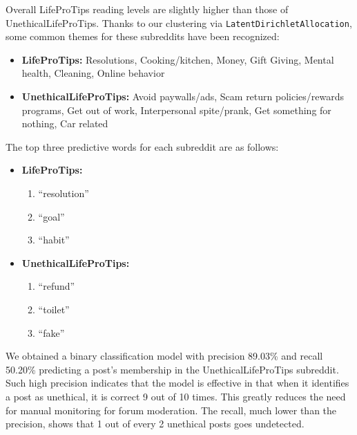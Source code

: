 \documentclass{amsart}
\theoremstyle{definition}
\theoremstyle{remark}
\newcommand{\tql}{\textquotedblleft}
\newcommand{\tqr}{\textquotedblright}
\begin{document}
Overall LifeProTips reading levels are slightly higher than those of UnethicalLifeProTips. Thanks to our clustering via \texttt{LatentDirichletAllocation}, some common themes for these subreddits have been recognized:
\begin{itemize}

	\item \textbf{LifeProTips:} Resolutions, Cooking/kitchen, Money, Gift Giving, Mental health, Cleaning, Online behavior
	
	\item \textbf{UnethicalLifeProTips:} Avoid paywalls/ads, Scam return policies/rewards programs, Get out of work, Interpersonal spite/prank, Get something for nothing, Car related

\end{itemize}
The top three predictive words for each subreddit are as follows:
\begin{itemize}
	
	\item \textbf{LifeProTips:}
	
		\begin{enumerate}
		
			\item \tql resolution\tqr
			
			\item \tql goal\tqr
			
			\item \tql habit\tqr
		
		\end{enumerate}
	
	\item \textbf{UnethicalLifeProTips:}
	
		\begin{enumerate}
		
			\item \tql refund\tqr
			
			\item \tql toilet\tqr
			
			\item \tql fake\tqr
		
		\end{enumerate}
	
\end{itemize}

We obtained a binary classification model with precision 89.03\% and recall 50.20\% predicting a post's membership in the UnethicalLifeProTips subreddit.  Such high precision indicates that the model is effective in that when it identifies a post as unethical, it is correct 9 out of 10 times.  This greatly reduces the need for manual monitoring for forum moderation.  The recall, much lower than the precision, shows that 1 out of every 2 unethical posts goes undetected.
\end{document}
